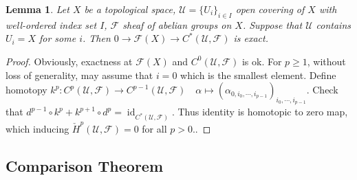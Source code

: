 \documentclass{ctexart}
\newtheorem{lemma}{Lemma}[section]
\newcommand{\identity}{\operatorname{id}}
\begin{document}
\begin{lemma}
    Let $X$ be a topological space, $\mathcal{U} = \{U_{i}\}_{i\in I}$ open covering of $X$ with well-ordered index set $I$, $\mathcal{F}$ sheaf of abelian groups on $X$.
    Suppose that $\mathcal{U}$ contains $U_{i} = X$ for some $i$.
    Then $0 \longrightarrow \mathcal{F}(X) \longrightarrow C^{\ast}(\mathcal{U}, \mathcal{F})$ is exact.
    \label{Lemma 2.5}
\end{lemma}
\begin{proof}
    Obviously, exactness at $\mathcal{F}(X)$ and $C^{0}(\mathcal{U}, \mathcal{F})$ is ok.
    For $p \ge 1$, without loss of generality, may assume that $i = 0$ which is the smallest element.
    Define homotopy $k^{p}: C^{p}(\mathcal{U}, \mathcal{F}) \longrightarrow C^{p - 1}(\mathcal{U}, \mathcal{F})\quad \alpha \longmapsto (\alpha_{0, i_{0}, \cdots, i_{p - 1}})_{i_{0}, \cdots, i_{p - 1}}$.
    Check that $d^{p - 1} \circ k^{p} + k^{p + 1} \circ d^{p} = \identity_{C^{\ast}(\mathcal{U}, \mathcal{F})}$.
    Thus identity is homotopic to zero map, which inducing $\check{H}^{p}(\mathcal{U}, \mathcal{F}) = 0$ for all $p > 0$.. 
\end{proof}

\subsection{Comparison Theorem}
\label{subsection:Sheaf_Cohomology_Comparison_Theorem}
\end{document}
